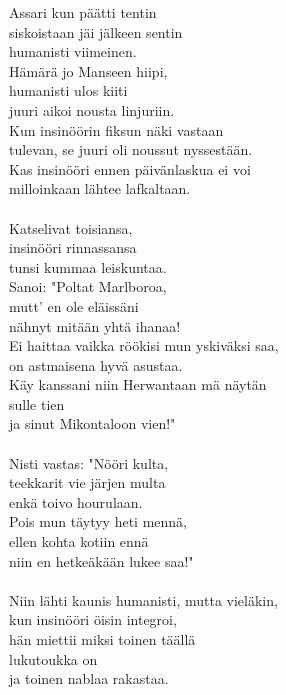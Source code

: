 
Assari kun päätti tentin \\ siskoistaan jäi jälkeen sentin \\ humanisti viimeinen. \\ Hämärä jo Manseen hiipi, \\ humanisti ulos kiiti \\ juuri aikoi nousta linjuriin. \\ Kun insinöörin fiksun näki vastaan \\ tulevan, se juuri oli noussut nyssestään. \\ Kas insinööri ennen päivänlaskua ei voi \\ milloinkaan lähtee lafkaltaan. \\ \hspace{10mm} \\ Katselivat toisiansa, \\ insinööri rinnassansa \\ tunsi kummaa leiskuntaa. \\ Sanoi: "Poltat Marlboroa, \\ mutt' en ole eläissäni \\ nähnyt mitään yhtä ihanaa! \\ Ei haittaa vaikka röökisi mun yskiväksi saa, \\ on astmaisena hyvä asustaa. \\ Käy kanssani niin Herwantaan mä näytän \\ sulle tien \\ ja sinut Mikontaloon vien!" \\ \hspace{10mm} \\ Nisti vastas: "Nööri kulta, \\ teekkarit vie järjen multa \\ enkä toivo hourulaan. \\ Pois mun täytyy heti mennä, \\ ellen kohta kotiin ennä \\ niin en hetkeäkään lukee saa!" \\ \hspace{10mm} \\ Niin lähti kaunis humanisti, mutta vieläkin, \\ kun insinööri öisin integroi, \\ hän miettii miksi toinen täällä \\ lukutoukka on \\ ja toinen nablaa rakastaa.